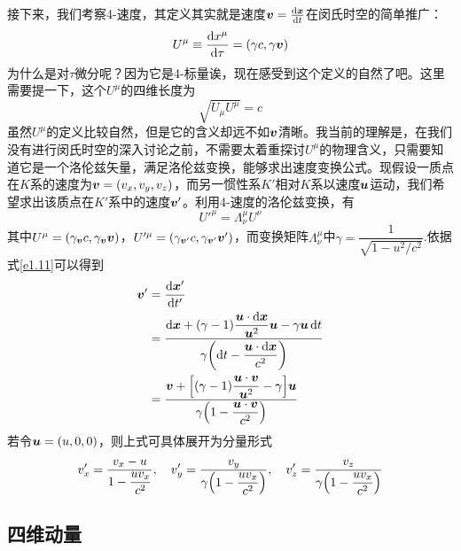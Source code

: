\documentclass[12pt, a4paper, oneside]{ctexbook}
\begin{document}
接下来，我们考察4-速度，其定义其实就是速度$\vb*{v}=\dv{\vb*{x}}{t}$在闵氏时空的简单推广：
\begin{equation}
	U^{\mu}\equiv\dv{x^{\mu}}{\tau}=(\gamma c,\gamma\vb*{v})
\end{equation}
为什么是对$\tau$微分呢？因为它是4-标量诶，现在感受到这个定义的自然了吧。这里需要提一下，这个$U^{\mu}$的四维长度为
\begin{equation}
	\sqrt{U_{\mu}U^{\mu}}=c
\end{equation}
虽然$U^{\mu}$的定义比较自然，但是它的含义却远不如$\vb*{v}$清晰。我当前的理解是，在我们没有进行闵氏时空的深入讨论之前，不需要太着重探讨$U^{\mu}$的物理含义，只需要知道它是一个洛伦兹矢量，满足洛伦兹变换，能够求出速度变换公式。现假设一质点在$K$系的速度为$\vb*{v}=(v_{x},v_{y},v_{z})$，而另一惯性系$K'$相对$K$系以速度$\vb*{u}$运动，我们希望求出该质点在$K'$系中的速度$\vb*{v}'$。利用4-速度的洛伦兹变换，有
\begin{equation}
	U'^{\mu}=\Lambda^{\mu}_{\nu}U^{\nu}
\end{equation}
其中$U^{\mu}=(\gamma_{\vb*{v}} c,\gamma_{\vb*{v}}\vb*{v})$，$U'^{\mu}=(\gamma_{\vb*{v}'} c,\gamma_{\vb*{v}'}\vb*{v}')$，而变换矩阵$\Lambda^{\mu}_{\nu}$中$\gamma=\dfrac{1}{\sqrt{1-u^{2}/c^{2}}}$.依据式\eqref{e1.11}可以得到
\begin{equation}
	\begin{split}
		\vb*{v}'&=\dv{\vb*{x}'}{t'}\\
		&=\dfrac{\dd{\vb*{x}}+(\gamma-1)\dfrac{\vb*{u}\cdot\dd{\vb*{x}}}{\vb*{u}^{2}}\vb*{u}-\gamma\vb*{u}\dd{t}}{\gamma\qty(\dd{t}-\dfrac{\vb*{u}\cdot\dd{\vb*{x}}}{c^{2}})}\\
		&=\dfrac{\vb*{v}+\qty[(\gamma-1)\dfrac{\vb*{u}\cdot\vb*{v}}{\vb*{u}^{2}}-\gamma]\vb*{u}}{\gamma\qty(1-\dfrac{\vb*{u}\cdot\vb*{v}}{c^{2}})}
	\end{split}
\end{equation}
若令$\vb*{u}=(u,0,0)$，则上式可具体展开为分量形式
\begin{equation}\label{general-velocity-superposition}
	v_{x}'=\dfrac{v_{x}-u}{1-\dfrac{uv_{x}}{c^{2}}},\quad v_{y}'=\dfrac{v_{y}}{\gamma\qty(1-\dfrac{uv_{x}}{c^{2}})},\quad v_{z}'=\dfrac{v_{z}}{\gamma\qty(1-\dfrac{uv_{x}}{c^{2}})}
\end{equation}

\subsection{四维动量}
\end{document}
